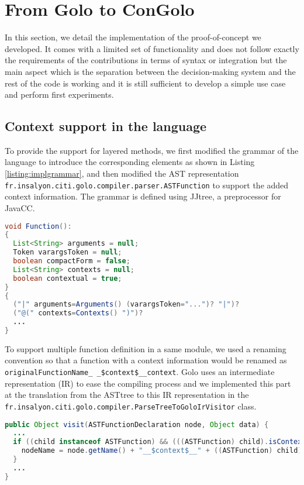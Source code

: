 \documentclass{sig-alternate}
\begin{document}
\section{From Golo to ConGolo}
\label{implementation}

In this section, we detail the implementation of the proof-of-concept we developed. It comes with a limited set of functionality and does not follow exactly the requirements of the contributions in terms of syntax or integration but the main aspect which is the separation between the decision-making system and the rest of the code is working and it is still sufficient to develop a simple use case and perform first experiments. 

\subsection{Context support in the language}
To provide the support for layered methods, we first modified the grammar of the language to introduce the corresponding elements as shown in Listing \ref{listing:implgrammar}, and then modified the AST representation \lstinline|fr.insalyon.citi.golo.compiler.parser.ASTFunction| to support the added context information. The grammar is defined using JJtree, a preprocessor for JavaCC.

\begin{lstlisting}[float, language=Java, caption=Grammar modification - Golo.jjt, label={listing:implgrammar}]
void Function():
{
  List<String> arguments = null;
  Token varargsToken = null;
  boolean compactForm = false;
  List<String> contexts = null;
  boolean contextual = true;
}
{
  ("|" arguments=Arguments() (varargsToken="...")? "|")?
  ("@(" contexts=Contexts() ")")?
  ...
}
\end{lstlisting}

To support multiple function definition in a same module, we used a renaming convention so that a function with a context information would be renamed as \lstinline|originalFunctionName_ _$context$__context|.  Golo uses an intermediate representation (IR) to ease the compiling process and we implemented this part at the translation from the ASTtree to this IR representation in the \lstinline|fr.insalyon.citi.golo.compiler.ParseTreeToGoloIrVisitor| class.

\begin{lstlisting}[float, language=Java, caption=IR modification - ParseTreeToGoloIrVisitor.java, label={listing:implastfunction}]
public Object visit(ASTFunctionDeclaration node, Object data) {
  ...
  if ((child instanceof ASTFunction) && (((ASTFunction) child).isContextual())) {
    nodeName = node.getName() + "__$context$__" + ((ASTFunction) child).getContexts().get(0);
  }
  ...
}
\end{lstlisting}
\end{document}
